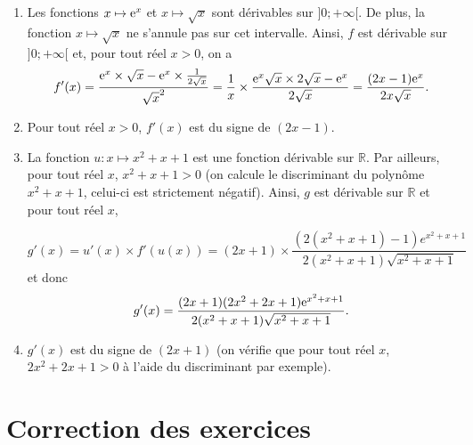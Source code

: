 \documentclass[11pt,fleqn]{book} %
\begin{document}
\begin{solution}\vspace{0pt}
\begin{enumerate}\item  Les fonctions \(x \mapsto \mathrm{e}^x\) et \(x\mapsto \sqrt{x}\) sont dérivables sur \(]0;+\infty[\). De plus, la fonction \(x \mapsto \sqrt{x}\) ne s'annule pas sur cet intervalle. Ainsi, \(f\) est dérivable sur \(]0;+\infty[\) et, pour tout réel \(x>0\), on a 
\[f'(x)= \dfrac{\mathrm{e}^x \times \sqrt{x} - \mathrm{e}^x \times \frac{1}{2\sqrt{x}}}{\sqrt{x}^2} = \dfrac{1}{x} \times \dfrac{\mathrm{e}^x\sqrt{x} \times 2 \sqrt{x} - \mathrm{e}^x}{2\sqrt{x}} = \dfrac{(2x-1)\mathrm{e}^x}{2x\sqrt{x}}.\]

\item Pour tout réel \(x>0\), \(f'(x)\) est du signe de \((2x-1)\).

\begin{center}
\end{center}


\item La fonction \(u : x\mapsto x^2+x+1\) est une fonction dérivable sur \(\mathbb{R}\). Par ailleurs, pour tout réel \(x\), \(x^2+x+1>0\) (on calcule le discriminant du polynôme \(x^2+x+1\), celui-ci est strictement négatif). Ainsi, \(g\) est dérivable sur \(\mathbb{R}\) et pour tout réel \(x\),

\[g'(x)= u'(x) \times f'(u(x)) = (2x+1) \times \dfrac{(2(x^2+x+1)-1)e^{x^2+x+1}}{2(x^2+x+1)\sqrt{x^2+x+1}}\]
et donc
\[g'(x)= \dfrac{(2x+1)(2x^2+2x+1)\mathrm{e}^{x^2+x+1}}{2(x^2+x+1)\sqrt{x^2+x+1}} .\]
\item \(g'(x)\) est du signe de \((2x+1)\) (on vérifie que pour tout réel \(x\), \(2x^2+2x+1 > 0\) à l'aide du discriminant par exemple).

\begin{center}
\end{center}
\end{enumerate}
\end{solution}



\chapter{Correction des exercices}


\printsolutions[headings={false} ]
\end{document}
